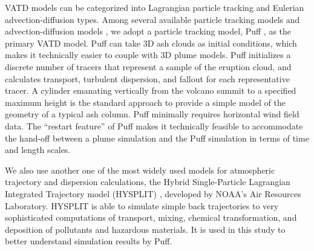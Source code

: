 \documentclass[utf8]{frontiersSCNS} %
\begin{document}
VATD models can be categorized into Lagrangian particle tracking and Eulerian advection-diffusion types. Among several available particle tracking models \citep[e.g.][]{walko1995hypact, searcy1998puff, d1998modeling, draxler1998overview} and advection-diffusion models \citep[e.g.][]{bonadonna2005total, folch2009fall3d, schwaiger2012ash3d}, we adopt a particle tracking model, Puff \citep{tanaka1991development,searcy1998puff}, as the primary VATD model. Puff can take 3D ash clouds as initial conditions, which makes it technically easier to couple with 3D plume models. Puff initializes a discrete number of tracers that represent a sample of the eruption cloud, and calculates transport, turbulent dispersion, and fallout for each representative tracer. A cylinder emanating vertically from the volcano summit to a specified maximum height is the standard approach to provide a simple model of the geometry of a typical ash column. Puff minimally requires horizontal wind field data. The ``restart feature'' of Puff makes it technically feasible to accommodate the hand-off between a plume simulation and the Puff simulation in terms of time and length scales.

We also use another one of the most widely used models for atmospheric trajectory and dispersion calculations, the Hybrid Single-Particle Lagrangian Integrated Trajectory model (HYSPLIT) \citep{stein2015noaa, rolph2017real}, developed by NOAA's Air Resources Laboratory. HYSPLIT is able to simulate simple back trajectories to very sophisticated computations of transport, mixing, chemical transformation, and deposition of pollutants and hazardous materials. It  is used in this study to better understand simulation results by Puff.
\end{document}
